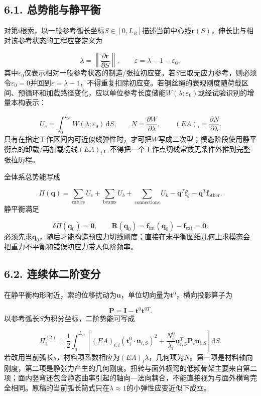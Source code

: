 \documentclass[UTF8,a4paper,11pt,fontset=none]{ctexart}
\begin{document}
\subsection*{6.1. 总势能与静平衡}
对第i根索，以一般参考弧长坐标\(S\in[0,\allowbreak L_R]\)\allowbreak{}描述当前中心线\(\mathbf r(S)\)\allowbreak{}，伸长比与相对该参考状态的工程应变定义为\par
\[
\lambda=\left\|\frac{\partial\mathbf r}{\partial S}\right\|,
\qquad
\varepsilon=\lambda-1-\varepsilon_0,
\]
其中\(\varepsilon_0\)\allowbreak{}仅表示相对一般参考状态的制造/张拉初应变。若\(S\)\allowbreak{}已取无应力参考，则必须令\(\varepsilon_0=0\)\allowbreak{}并回到\(\varepsilon=\lambda-1\)\allowbreak{}，不得重复扣除初应变。若钢丝绳的表观刚度随荷载区间、预循环和加载路径变化，应以单位参考长度储能\(W(\lambda;\allowbreak \varepsilon_0)\)\allowbreak{}或经试验识别的增量本构表示：\par
\[
U_c=\int_0^{L_R}W(\lambda;\varepsilon_0)\,\mathrm dS,
\qquad
N=\frac{\partial W}{\partial\lambda},
\qquad
(EA)_t=\frac{\partial N}{\partial\lambda}.
\]
只有在指定工作区间内可近似线弹性时，才可把\(W\)\allowbreak{}写成二次型；模态阶段使用静平衡点的卸载/再加载切线\((EA)_t\)\allowbreak{}，不得把一个工作点切线常数无条件外推到完整张拉历程。\par
全体系总势能写成\par
\[
\Pi(\mathbf q)=
\sum_{\mathrm{cables}}U_c
+
\sum_{\mathrm{beams}}U_b
+
\sum_{\mathrm{connections}}U_k
-
\mathbf q^T\mathbf f_g
-
\mathbf q^T\mathbf f_{\mathrm{other}}.
\]
静平衡满足\par
\[
\delta\Pi(\mathbf q_0)=\mathbf 0,
\qquad
\mathbf R(\mathbf q_0)=\mathbf f_{\mathrm{int}}(\mathbf q_0)-\mathbf f_{\mathrm{ext}}=\mathbf0.
\]
必须先求\(\mathbf q_0\)\allowbreak{}，随后才能构造预应力切线刚度；直接在未平衡图纸几何上求模态会把重力不平衡和错误初应力带入低阶频率。\par
{}
\subsection*{6.2. 连续体二阶变分}
在静平衡构形附近，索的位移扰动为\(\mathbf u\)\allowbreak{}，单位切向量为\(\mathbf t^0\)\allowbreak{}，横向投影算子为\par
\[
\mathbf P=\mathbf I-\mathbf t^0\mathbf t^{0T}.
\]
以参考弧长\(S\)\allowbreak{}为积分坐标，二阶势能可写成\par
\[
\Pi_i^{(2)}=
\frac12\int_0^{L_R}
\left[
(EA)_{t,i}\left(\mathbf t_i^0\cdot\mathbf u_{i,S}\right)^2
+
\frac{N_i^0}{\lambda_i}
\mathbf u_{i,S}^{T}\mathbf P_i\mathbf u_{i,S}
\right]\mathrm dS.
\]
若改用当前弧长\(s\)\allowbreak{}，材料项系数相应为\((EA)_t\lambda\)\allowbreak{}，几何项为\(N\)\allowbreak{}。第一项是材料轴向刚度，第二项是静张力产生的几何刚度。扭转与面外横弯的低频骨架主要来自第二项；面内竖弯还包含静态曲率引起的轴向—法向耦合，不能直接视为与面外横弯完全相同。原稿的当前弧长简式只在\(\lambda\approx1\)\allowbreak{}的小弹性应变近似下成立。\par
{}
\end{document}
